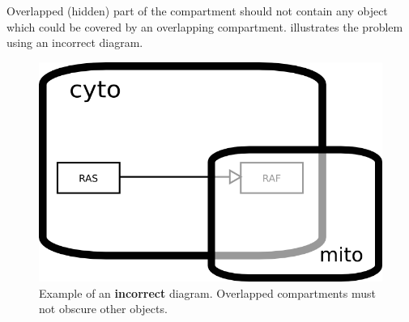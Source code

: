 Overlapped (hidden) part of the compartment should not contain any object which could be covered by an overlapping compartment.   illustrates the problem using an incorrect diagram.

\begin{figure}[H]
  \centering
  \includegraphics[scale = 0.45]{src/examples/compartment_overlapping_wrong.png}
  \caption{Example of an \textbf{incorrect} diagram.  Overlapped compartments must not obscure other objects.}
  \label{fig:overlap-bad}
\end{figure}

